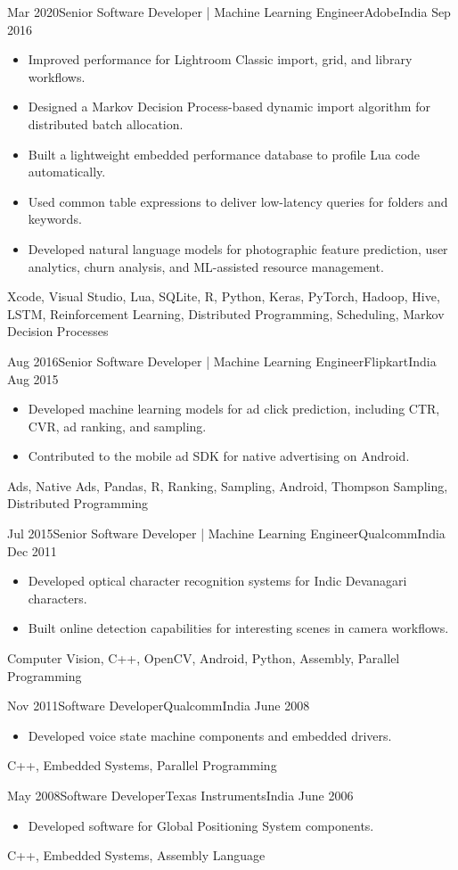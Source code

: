 \begin{experiences}
	\experience
	{Mar 2020}{Senior Software Developer | Machine Learning Engineer}{Adobe}{India}
	{Sep 2016}{
		\begin{itemize}
			\item Improved performance for Lightroom Classic import, grid, and library workflows.
			\item Designed a Markov Decision Process-based dynamic import algorithm for distributed batch allocation.
			\item Built a lightweight embedded performance database to profile Lua code automatically.
			\item Used common table expressions to deliver low-latency queries for folders and keywords.
			\item Developed natural language models for photographic feature prediction, user analytics, churn analysis, and ML-assisted resource management.
		\end{itemize}
		}
	{Xcode, Visual Studio, Lua, SQLite, R, Python, Keras, PyTorch, Hadoop, Hive, LSTM, Reinforcement Learning, Distributed Programming, Scheduling, Markov Decision Processes}
	\emptySeparator

	\experience
	{Aug 2016}{Senior Software Developer | Machine Learning Engineer}{Flipkart}{India}
	{Aug 2015}{
		\begin{itemize}
			\item Developed machine learning models for ad click prediction, including CTR, CVR, ad ranking, and sampling.
			\item Contributed to the mobile ad SDK for native advertising on Android.
		\end{itemize}
	}
	{Ads, Native Ads, Pandas, R, Ranking, Sampling, Android, Thompson Sampling, Distributed Programming}
	\emptySeparator

	\experience
	{Jul 2015}{Senior Software Developer | Machine Learning Engineer}{Qualcomm}{India}
	{Dec 2011}{
		\begin{itemize}
			\item Developed optical character recognition systems for Indic Devanagari characters.
			\item Built online detection capabilities for interesting scenes in camera workflows.
		\end{itemize}
	}
	{Computer Vision, C++, OpenCV, Android, Python, Assembly, Parallel Programming}
	\emptySeparator

	\experience
	{Nov 2011}{Software Developer}{Qualcomm}{India}
	{June 2008}{
		\begin{itemize}
			\item Developed voice state machine components and embedded drivers.
		\end{itemize}
		}
	{C++, Embedded Systems, Parallel Programming}
	\emptySeparator

	\experience
	{May 2008}{Software Developer}{Texas Instruments}{India}
	{June 2006}{
		\begin{itemize}
			\item Developed software for Global Positioning System components.
		\end{itemize}
		}
	{C++, Embedded Systems, Assembly Language}
\end{experiences}
